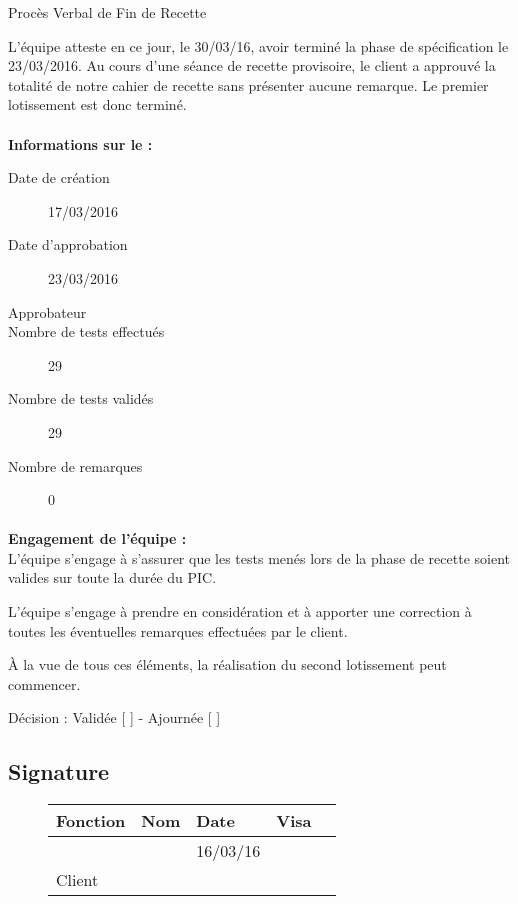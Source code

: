 \documentclass[asi, sansVersion]{picInsa}
\begin{document}
 
 \begin{center}
  \LARGE{}
    Procès Verbal de Fin de Recette\\
 \end{center}
 
 \normalsize{}
 
L'équipe \nomEquipe{} atteste en ce jour, le 30/03/16, avoir terminé la phase de spécification le 23/03/2016.
Au cours d'une séance de recette provisoire, le client a approuvé la totalité de notre cahier de recette sans présenter aucune remarque. Le premier lotissement est donc terminé.


\paragraph{}
\textbf{Informations sur le \CDR :}

\begin{description}
  \item[Date de création]17/03/2016
  \item[Date d'approbation]23/03/2016
  \item[Approbateur]\nomClient
  \item[Nombre de tests effectués]29
  \item[Nombre de tests validés]29
  \item[Nombre de remarques]0
\end{description}


\paragraph{}
\textbf{Engagement de l'équipe :}\\


L'équipe \nomEquipe{} s'engage à s'assurer que les tests menés lors de la phase de recette soient valides sur toute la durée du PIC.


L'équipe \nomEquipe{} s'engage à prendre en considération et à apporter une correction à toutes les éventuelles remarques effectuées par le client.

À la vue de tous ces éléments, la réalisation du second lotissement peut commencer.

\begin{center}
Décision : Validée [ \checkmark{} ] - Ajournée [ ]
\end{center}

\subsection*{Signature}
\begin{figure}[H]
		\centering
		\begin{tabularx}{17cm}{|p{4cm}|X|X|X|X|}
		\hline
		\rowcolor[gray]{0.85} Fonction & Nom & Date & Visa \\
		\hline
		\CP{} & \Sergi{} & 16/03/16 & \\
		\hline
		Client & \nomClient & & \\
		\hline
		\end{tabularx}
\end{figure}
\end{document}
